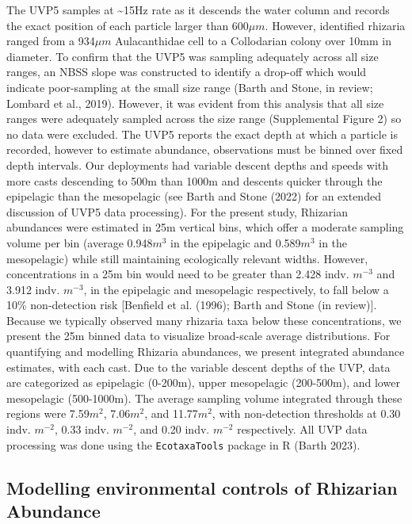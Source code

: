 \documentclass[
]{article}
\begin{document}
The UVP5 samples at \textasciitilde15Hz rate as it descends the water
column and records the exact position of each particle larger than
600\(\mu m\). However, identified rhizaria ranged from a 934\(\mu m\)
Aulacanthidae cell to a Collodarian colony over 10mm in diameter. To
confirm that the UVP5 was sampling adequately across all size ranges, an
NBSS slope was constructed to identify a drop-off which would indicate
poor-sampling at the small size range (Barth and Stone, in review;
Lombard et al., 2019). However, it was evident from this analysis that
all size ranges were adequately sampled across the size range
(Supplemental Figure 2) so no data were excluded. The UVP5 reports the
exact depth at which a particle is recorded, however to estimate
abundance, observations must be binned over fixed depth intervals. Our
deployments had variable descent depths and speeds with more casts
descending to 500m than 1000m and descents quicker through the
epipelagic than the mesopelagic (see Barth and Stone (2022) for an
extended discussion of UVP5 data processing). For the present study,
Rhizarian abundances were estimated in 25m vertical bins, which offer a
moderate sampling volume per bin (average 0.948\(m^3\) in the epipelagic
and 0.589\(m^3\) in the mesopelagic) while still maintaining
ecologically relevant widths. However, concentrations in a 25m bin would
need to be greater than 2.428 indv. \(m^{-3}\) and 3.912 indv.
\(m^{-3}\), in the epipelagic and mesopelagic respectively, to fall
below a 10\% non-detection risk {[}Benfield et al. (1996); Barth and
Stone (in review){]}. Because we typically observed many rhizaria taxa
below these concentrations, we present the 25m binned data to visualize
broad-scale average distributions. For quantifying and modelling
Rhizaria abundances, we present integrated abundance estimates, with
each cast. Due to the variable descent depths of the UVP, data are
categorized as epipelagic (0-200m), upper mesopelagic (200-500m), and
lower mesopelagic (500-1000m). The average sampling volume integrated
through these regions were 7.59\(m^2\), 7.06\(m^2\), and 11.77\(m^2\),
with non-detection thresholds at 0.30 indv. \(m^{-2}\), 0.33 indv.
\(m^{-2}\), and 0.20 indv. \(m^{-2}\) respectively. All UVP data
processing was done using the \texttt{EcotaxaTools} package in R (Barth
2023).

\hypertarget{modelling-environmental-controls-of-rhizarian-abundance}{%
\subsection{Modelling environmental controls of Rhizarian
Abundance}\label{modelling-environmental-controls-of-rhizarian-abundance}}
\end{document}
